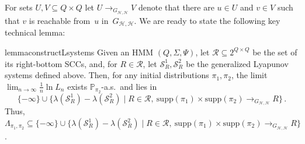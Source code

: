 \documentclass[a4paper,UKenglish,cleveref, autoref,mathscr]{lipics-v2019}
\newcommand{\PP}{\mathbb{P}}
\newcommand{\1}{\mathbbm{1}}
\newcommand{\supp}{\mathrm{supp}}
\newcommand{\liexp}{\lim_{n\rightarrow\infty} \frac1n \ln L_n}
\renewcommand{\H}{\mathcal{H}}
\renewcommand{\S}{\mathcal{S}}
\begin{document}
For sets $U, V \subseteq Q \times Q$ let $U \longrightarrow_{G_{\H,\H}} V$ denote that there are $u \in U$ and $v \in V$ such that $v$ is reachable from~$u$ in~$G_{\H,\H}$.
We are ready to state the following key technical lemma:%
\begin{restatable}{lemma}{constructLsystems}\label{lem:construct-L-systems}
Given an HMM $(Q, \Sigma, \Psi)$, let $\mathcal{R} \subseteq 2^{Q \times Q}$ be the set of its right-bottom SCCs, and, for $R \in \mathcal{R}$, let $\S_{R}^1, \S_{R}^2$ be the generalized Lyapunov systems defined above.
Then, for any initial distributions $\pi_1, \pi_2$, the limit $\liexp$ exists $\PP_{\pi_2}$-a.s.\ and lies in
\[
\{-\infty\} \cup \{\lambda(\S_{R}^1) - \lambda(\S_{R}^2) \mid R \in \mathcal{R},\ \supp(\pi_1) \times \supp(\pi_2) \longrightarrow_{G_{\H,\H}} R\} \,.
\]
Thus,
$\Lambda_{\pi_1,\pi_2} \subseteq \{-\infty\} \cup \{\lambda(\S_{R}^1) - \lambda(\S_{R}^2) \mid R \in \mathcal{R},\ \supp(\pi_1) \times \supp(\pi_2) \longrightarrow_{G_{\H,\H}} R\}$.
\end{restatable}
\end{document}

